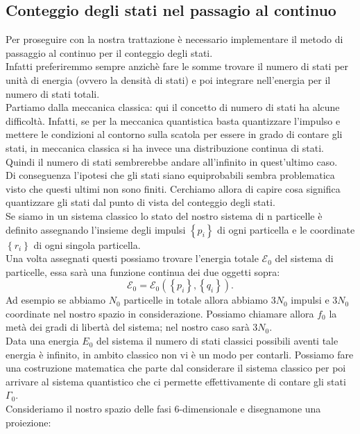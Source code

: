 \subsection{Conteggio degli stati nel passagio al continuo}%
Per proseguire con la nostra trattazione è necessario implementare il metodo di passaggio al continuo per il conteggio degli stati. \\
Infatti preferiremmo sempre anzichè fare le somme trovare il numero di stati per unità di energia (ovvero la densità di stati) e poi integrare nell'energia per il numero di stati totali.\\
Partiamo dalla meccanica classica: qui il concetto di numero di stati ha alcune difficoltà. Infatti, se per la meccanica quantistica basta quantizzare l'impulso e mettere le condizioni al contorno sulla scatola per essere in grado di contare gli stati, in meccanica classica si ha invece una distribuzione continua di stati. Quindi il numero di stati sembrerebbe andare all'infinito in quest'ultimo caso.\\ 
Di conseguenza l'ipotesi che gli stati siano equiprobabili sembra problematica visto che questi ultimi non sono finiti. Cerchiamo allora di capire cosa significa quantizzare gli stati dal punto di vista del conteggio degli stati. \\
Se siamo in un sistema classico lo stato del nostro sistema di n particelle è definito assegnando l'insieme degli impulsi $\left\{ p_{i} \right\}$ di ogni particella e le coordinate $\left\{ r_{i} \right\}$ di ogni singola particella.\\
Una volta assegnati questi possiamo trovare l'energia totale $\mathcal{E}_{0}$ del sistema di particelle, essa sarà una funzione continua dei due oggetti sopra:
\[
	\mathcal{E}_{0} = \mathcal{E}_{0}\left( \left\{ p_{i} \right\} , \left\{ q_{i} \right\}  \right) 
.\] 
Ad esempio se abbiamo $N_0$ particelle in totale allora abbiamo $3N_0$ impulsi e $3N_0$ coordinate nel nostro spazio in considerazione. Possiamo chiamare allora $f_0$ la metà dei gradi di libertà del sistema; nel nostro caso sarà $3N_0$.\\
Data una energia $E_0$ del sistema il numero di stati classici possibili aventi tale energia è infinito, in ambito classico non vi è un modo per contarli. Possiamo fare una costruzione matematica che parte dal considerare il sistema classico per poi arrivare al sistema quantistico che ci permette effettivamente di contare gli stati $\Gamma_0$.\\
Consideriamo il nostro spazio delle fasi 6-dimensionale e disegnamone una proiezione:
